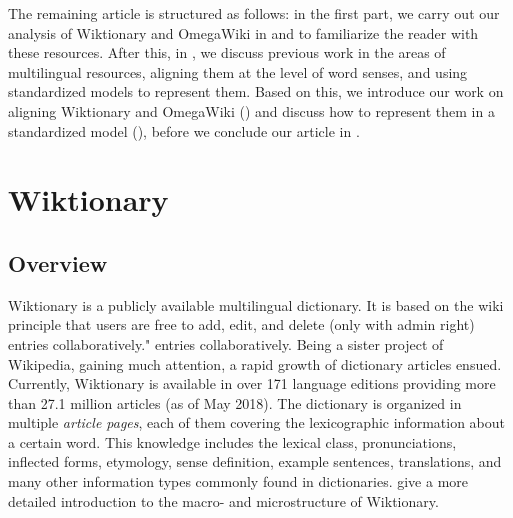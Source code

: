 \documentclass[output=paper]{LSP/langsci}
\begin{document}
The remaining article is structured as follows: in the first part, we carry out our analysis of Wiktionary and OmegaWiki in  and  to familiarize the reader with these resources. After this, in , we discuss previous work in the areas of multilingual resources, aligning them at the level of word senses, and using standardized models to represent them. Based on this, we introduce our work on aligning Wiktionary and OmegaWiki () and discuss how to represent them in a  standardized model (), before we conclude our article in .


\section{Wiktionary}
\label{sec:matuschek:wiktionary}
\label{sec:matuschek:body}

\subsection{Overview}
Wiktionary is a publicly available multilingual dictionary. It is based on the wiki  
principle that users are free to add, edit, and delete (only with admin right) entries collaboratively."
entries collaboratively. Being a sister project of Wikipedia, gaining much attention, a rapid growth of dictionary articles ensued. Currently, Wiktionary is available in over 171 language editions providing more than 27.1 million articles (as of May 2018).   
The dictionary is organized in multiple \emph{article pages}, each of them covering the lexicographic information about a certain word. This knowledge includes the lexical class, pronunciations, inflected forms, etymology, sense definition, example sentences, translations, and many other information types commonly found in dictionaries. \citet{Meyer12a} give a more detailed introduction to the macro- and microstructure of Wiktionary.
\end{document}
